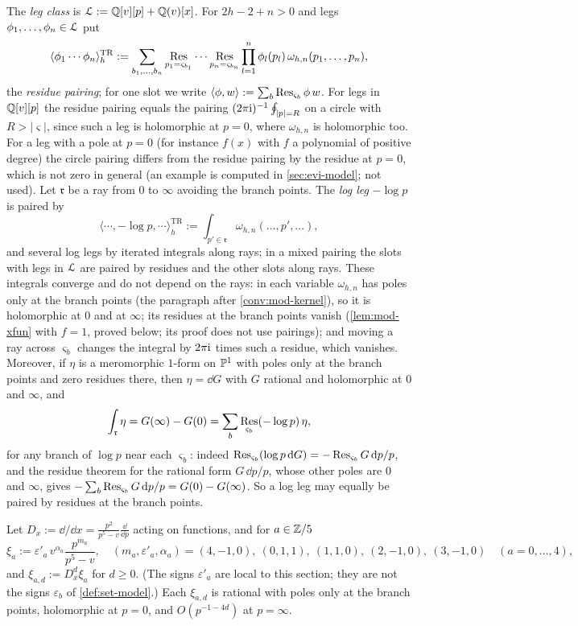 \begin{defn}
\label{def:mod-pair}
The \emph{leg class} is $\mathcal{L}:=\mathbb{Q}[v][p]+\mathbb{Q}(v)[x]$. For $2h-2+n>0$ and legs $\phi_1,\dots,\phi_n\in\mathcal{L}$ put
\[
\langle\phi_1\cdots\phi_n\rangle^{\mathrm{TR}}_h:=\sum_{b_1,\dots,b_n}\operatorname*{Res}_{p_1=\varsigma_{b_1}}\cdots\operatorname*{Res}_{p_n=\varsigma_{b_n}}\prod_{l=1}^n\phi_l(p_l)\,\omega_{h,n}(p_1,\dots,p_n),
\]
the \emph{residue pairing}; for one slot we write $\langle\phi,w\rangle:=\sum_b\operatorname*{Res}_{\varsigma_b}\phi\,w$. For legs in $\mathbb{Q}[v][p]$ the residue pairing equals the pairing $(2\pi\mathrm{i})^{-1}\oint_{|p|=R}$ on a circle with $R>|\varsigma|$, since such a leg is holomorphic at $p=0$, where $\omega_{h,n}$ is holomorphic too. For a leg with a pole at $p=0$ (for instance $f(x)$ with $f$ a polynomial of positive degree) the circle pairing differs from the residue pairing by the residue at $p=0$, which is not zero in general (an example is computed in \cref{sec:evi-model}; not used). Let $\mathfrak r$ be a ray from $0$ to $\infty$ avoiding the branch points. The \emph{log leg} $-\log p$ is paired by
\[
\langle\cdots,-\log p,\cdots\rangle^{\mathrm{TR}}_h:=\int_{p'\in\mathfrak r}\omega_{h,n}(\dots,p',\dots),
\]
and several log legs by iterated integrals along rays; in a mixed pairing the slots with legs in $\mathcal{L}$ are paired by residues and the other slots along rays. These integrals converge and do not depend on the rays: in each variable $\omega_{h,n}$ has poles only at the branch points (the paragraph after \cref{conv:mod-kernel}), so it is holomorphic at $0$ and at $\infty$; its residues at the branch points vanish (\cref{lem:mod-xfun} with $f=1$, proved below; its proof does not use pairings); and moving a ray across $\varsigma_b$ changes the integral by $2\pi\mathrm{i}$ times such a residue, which vanishes. Moreover, if $\eta$ is a meromorphic $1$-form on $\mathbb{P}^1$ with poles only at the branch points and zero residues there, then $\eta=\dd G$ with $G$ rational and holomorphic at $0$ and $\infty$, and
\[
\int_{\mathfrak r}\eta=G(\infty)-G(0)=\sum_b\operatorname*{Res}_{\varsigma_b}(-\log p)\,\eta,
\]
for any branch of $\log p$ near each $\varsigma_b$: indeed $\operatorname*{Res}_{\varsigma_b}(\log p\,\mathrm{d} G)=-\operatorname*{Res}_{\varsigma_b}G\,\mathrm{d} p/p$, and the residue theorem for the rational form $G\,\dd p/p$, whose other poles are $0$ and $\infty$, gives $-\sum_b\operatorname*{Res}_{\varsigma_b}G\,\mathrm{d} p/p=G(0)-G(\infty)$. So a log leg may equally be paired by residues at the branch points.
\end{defn}

\begin{defn}
\label{def:mod-xi}
Let $D_x:=\dd/\dd x=\frac{p^2}{p^5-v}\frac{\dd}{\dd p}$ acting on functions, and for $a\in\mathbb{Z}/5$
\[
\xi_a:=\varepsilon'_a\,v^{\alpha_a}\frac{p^{m_a}}{p^5-v},\quad (m_a,\varepsilon'_a,\alpha_a)=(4,-1,0),\ (0,1,1),\ (1,1,0),\ (2,-1,0),\ (3,-1,0)\quad(a=0,\dots,4),
\]
and $\xi_{a,d}:=D_x^d\xi_a$ for $d\geq 0$. (The signs $\varepsilon'_a$ are local to this section; they are not the signs $\varepsilon_b$ of \cref{def:set-model}.) Each $\xi_{a,d}$ is rational with poles only at the branch points, holomorphic at $p=0$, and $O(p^{-1-4d})$ at $p=\infty$.
\end{defn}

